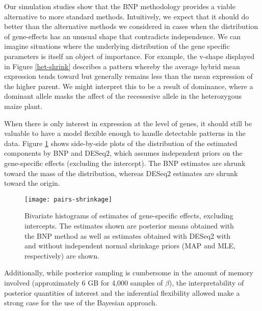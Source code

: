 {Our simulation studies show that the BNP methodology provides a viable alternative to more standard methods. Intuitively, we expect that it should do better than the alternative methods we considered in cases when the distribution of gene-effects has an unusual shape that contradicts independence. We can imagine situations where the underlying distribution of the gene specific parameters is itself an object of importance. For example, the v-shape displayed in Figure \ref{het-shrink} describes a pattern whereby the average hybrid mean expression tends toward but generally remains less than the mean expression of the higher parent. We might interpret this to be a result of dominance, where a dominant allele masks the affect of the recessesive allele in the heterozygous maize plant.

When there is only interest in expression at the level of genes, it should still be valuable to have a model flexible enough to handle detectable patterns in the data. Figure \ref{all-shrink} shows side-by-side plots of the distribution of the estimated components by BNP and DESeq2, which assumes independent priors on the gene-specific effects (excluding the intercept). The BNP estimates are shrunk toward the mass of the distribution, whereas DESeq2 estimates are shrunk toward the origin.


\begin{landscape}
\begin{figure}
\centering
\texttt{[image: pairs-shrinkage]}
\caption{Bivariate histograms of estimates of gene-specific effects, excluding intercepts. The estimates shown are posterior means obtained with the BNP method as well as estimates obtained with DESeq2 with and without independent normal shrinkage priors (MAP and MLE, respectively) are shown.}
\label{all-shrink}
\end{figure}
\end{landscape}

Additionally, while posterior sampling is cumbersome in the amount of memory involved (approximately 6 GB for 4,000 samples of $\beta$), the interpretability of posterior quantities of interest and the inferential flexibility allowed make a strong case for the use of the Bayesian approach.



}
